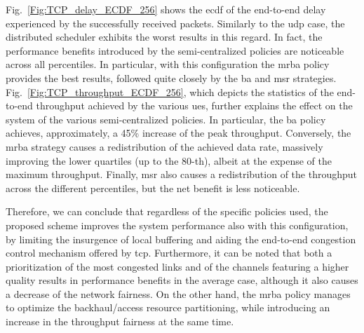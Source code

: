 Fig.~\ref{Fig:TCP_delay_ECDF_256} shows the \gls{ecdf} of the end-to-end delay experienced by the successfully received packets. Similarly to the \gls{udp} case, the distributed scheduler exhibits the worst results in this regard. In fact, the performance benefits introduced by the semi-centralized policies are noticeable across all percentiles. In particular, with this configuration the \gls{mrba} policy provides the best results, followed quite closely by the \gls{ba} and \gls{msr} strategies. Fig.~\ref{Fig:TCP_throughput_ECDF_256}, which depicts the statistics of the end-to-end throughput achieved by the various \glspl{ue}, further explains the effect on the system of the various semi-centralized policies. In particular, the \gls{ba} policy achieves, approximately, a 45\% increase of the peak throughput. Conversely, the \gls{mrba} strategy causes a redistribution of the achieved data rate, massively improving the lower quartiles (up to the 80-th), albeit at the expense of the maximum throughput. Finally, \gls{msr} also causes a redistribution of the throughput across the different percentiles, but the net benefit is less noticeable.

Therefore, we can conclude that regardless of the specific policies used, the proposed scheme improves the system performance also with this configuration, by limiting the insurgence of local buffering and aiding the end-to-end congestion control mechanism offered by \gls{tcp}. Furthermore, it can be noted that both a prioritization of the most congested links and of the channels featuring a higher quality results in performance benefits in the average case, although it also causes a decrease of the network fairness. On the other hand, the \gls{mrba} policy manages to optimize the backhaul/access resource partitioning, while introducing an increase in the throughput fairness at the same time.

%    

